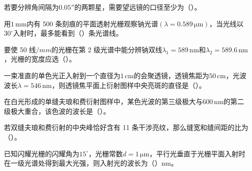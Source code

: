 \documentclass[padl, analysis, notocnum]{ExBook}
\newcommand{\answerarea}[1][3.5cm]{%
  \par\vspace{1mm}%
  \noindent{\color{themeColor!35}\rule{\linewidth}{0.4pt}}\par
  \noindent\begin{minipage}[t][#1][t]{\linewidth}\vspace{0pt}\end{minipage}\par
  \noindent{\color{themeColor!35}\rule{\linewidth}{0.4pt}}\par
}
\begin{document}
\begin{qitems}[startnum=9]
\qitem 若要分辨角间隔为$0.05''$的两颗星，需要望远镜的口径至少为（\hspace{1.6em}）。
\label{q:283:start}
\answerarea[4.0cm]
\label{q:283:end}
\end{qitems}

\begin{qitems}[startnum=10]
\qitem 用$1\,\mathrm{mm}$内有 500 条刻痕的平面透射光栅观察钠光谱$(\lambda =0.589\,\mathrm{\mu m})$，当光线以$30^{\circ}$入射时，最多能看到（\hspace{1.6em}）条光谱线。
\label{q:284:start}
\answerarea[4.0cm]
\label{q:284:end}
\end{qitems}

\begin{qitems}[startnum=11]
\qitem 要使 50 线$/mm$的光栅在第 2 级光谱中能分辨钠双线$\lambda_{1}=589\,\mathrm{nm}$和$\lambda_{2}=589.6\,\mathrm{nm}$，光栅的宽度应选（\hspace{1.6em}）。
\label{q:285:start}
\answerarea[4.0cm]
\label{q:285:end}
\end{qitems}

\begin{qitems}[startnum=12]
\qitem 一束准直的单色光正入射到一个直径为$1\,\mathrm{cm}$的会聚透镜，透镜焦距为$50\,\mathrm{cm}$，光波波长$\lambda =546\,\mathrm{nm}$，则透镜焦平面上衍射图样中央亮斑的直径是（\hspace{1.6em}）。
\label{q:286:start}
\answerarea[4.0cm]
\label{q:286:end}
\end{qitems}

\begin{qitems}[startnum=13]
\qitem 在白光形成的单缝夫琅和费衍射图样中，某色光波的第三级极大与$600\,\mathrm{nm}$的第二级极大重合，该色波的波长是（\hspace{1.6em}）。
\label{q:287:start}
\answerarea[4.0cm]
\label{q:287:end}
\end{qitems}

\begin{qitems}[startnum=14]
\qitem 若双缝夫琅和费衍射的中央峰恰好含有 11 条干涉亮纹，那么缝宽和缝间距的比为（\hspace{1.6em}）。
\label{q:288:start}
\answerarea[4.0cm]
\label{q:288:end}
\end{qitems}

\begin{qitems}[startnum=15]
\qitem 已知闪耀光栅的闪耀角为$15^{\circ}$，光栅常数$d=1\,\mathrm{\mu m}$，平行光垂直于光栅平面入射时在一级光谱处得到最大光强，则入射光的波长为（\hspace{1.6em}）nm。
\label{q:289:start}
\answerarea[4.0cm]
\label{q:289:end}
\end{qitems}
\end{document}
